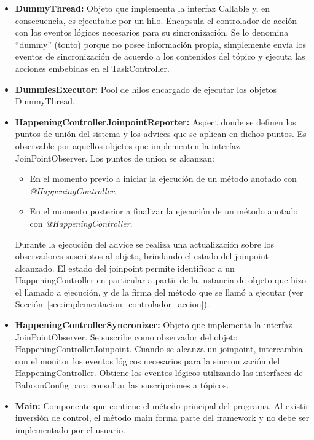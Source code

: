\begin{itemize}
  \item \textbf{DummyThread: } Objeto que implementa la interfaz Callable y, en
  consecuencia, es ejecutable por un hilo. Encapsula el controlador de acción
  con los eventos lógicos necesarios para su sincronización. Se lo denomina
  ``dummy'' (tonto) porque no posee información propia, simplemente envía los
  eventos de sincronización de acuerdo a los contenidos del tópico y ejecuta
  las acciones embebidas en el TaskController.
  
  \item \textbf{DummiesExecutor: } Pool de hilos encargado de ejecutar los
  objetos DummyThread.
  
  \item \textbf{HappeningControllerJoinpointReporter: } Aspect donde se
  definen los puntos de unión del sistema y los advices que se aplican en
  dichos puntos.
  Es observable por aquellos objetos que implementen la interfaz
  JoinPointObserver.
  Los puntos de union se alcanzan:
  	\begin{itemize}
  	  \item  En el momento previo a iniciar la ejecución de un
  	  método anotado con \emph{@HappeningController}.
  	  \item En el momento posterior a finalizar la ejecución de un
  	  método anotado con \emph{@HappeningController}.
  	\end{itemize}
  Durante la ejecución del advice se realiza una actualización sobre los
  observadores suscriptos al objeto, brindando el estado del joinpoint
  alcanzado. El estado del joinpoint permite identificar a un
  HappeningController en particular a partir de la instancia de objeto que hizo
  el llamado a ejecución, y de la firma del método que se llamó a ejecutar (ver
  Sección~\ref{sec:implementacion_controlador_accion}).
  
  \item \textbf{HappeningControllerSyncronizer: } Objeto que implementa la
  interfaz JoinPointObserver. Se suscribe como observador del objeto
  HappeningControllerJoinpoint. Cuando se alcanza un joinpoint, intercambia con
  el monitor los eventos lógicos necesarios para la sincronización del
  HappeningController. Obtiene los eventos lógicos utilizando las
  interfaces de BaboonConfig para consultar las suscripciones a tópicos.
  
  \item \textbf{Main: } Componente que contiene el método principal del
  programa. Al existir inversión de control, el método main forma parte del
  framework y no debe ser implementado por el usuario.
\end{itemize}

